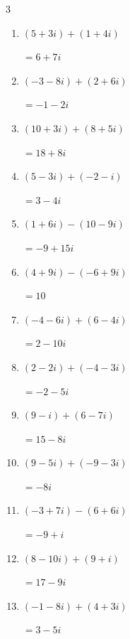\begin{multicols}{3}
\begin{enumerate}
        $\displaystyle =3-3i$

  \item $\displaystyle (5+3i) + (1+4i)$

        $\displaystyle =6+7i$

  \item $\displaystyle (-3-8i) + (2+6i)$

        $\displaystyle =-1-2i$

  \item $\displaystyle (10+3i) + (8+5i)$

        $\displaystyle =18+8i$

  \item $\displaystyle (5-3i) + (-2-i)$

        $\displaystyle =3-4i$

  \item $\displaystyle (1+6i) - (10-9i)$

        $\displaystyle =-9+15i$

  \item $\displaystyle (4+9i) - (-6+9i)$

        $\displaystyle =10$

  \item $\displaystyle (-4-6i) + (6-4i)$

        $\displaystyle =2-10i$

  \item $\displaystyle (2-2i) + (-4-3i)$

        $\displaystyle =-2-5i$

\columnbreak %

  \item $\displaystyle (9-i) + (6-7i)$

        $\displaystyle =15-8i$

  \item $\displaystyle (9-5i) + (-9-3i)$

        $\displaystyle =-8i$

  \item $\displaystyle (-3+7i) - (6+6i)$

        $\displaystyle =-9+i$

  \item $\displaystyle (8-10i) + (9+i)$

        $\displaystyle =17-9i$

  \item $\displaystyle (-1-8i) + (4+3i)$

        $\displaystyle =3-5i$


\end{enumerate}
\end{multicols}
